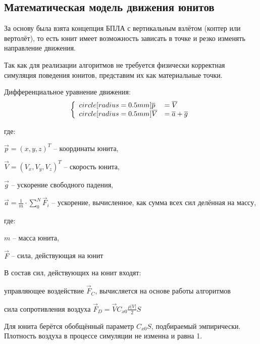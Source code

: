 \subsection{Математическая модель движения юнитов}

За основу была взята концепция БПЛА с вертикальным взлётом (коптер или вертолёт),
то есть юнит имеет возможность зависать в точке и резко изменять направление движения.

Так как для реализации алгоритмов не требуется физически корректная симуляция
поведения юнитов, представим их как материальные точки.

Дифференциальное уравнение движения:
$$
\left\{
    \begin{array}{l l}
    \dot{\vec{p}}  & = \vec V \\
    \dot{\vec{V}}  & = \vec a + \vec g
    \end{array}
\right.
$$

где:

$\vec p = (x,y,z)^T$ -- координаты юнита,

$\vec V = (V_x,V_y,V_z)^T$ -- скорость юнита,

$\vec g$ -- ускорение свободного падения,

$\vec a = \frac{1}{m} \cdot \sum_0^N \vec F_i$ -- ускорение,
вычисленное, как сумма всех сил делённая на массу,

где:

$m$ -- масса юнита,

$\vec F$ -- сила, действующая на юнит

В состав сил, действующих на юнит входят:

\begin{mintemize}
\item управляющее воздействие $\vec F_C$, вычисляется на основе работы алгоритмов
\item сила сопротивления воздуха $\vec F_D = \vec V C_{x0} \frac{\rho |V|}{2} S$
\end{mintemize}

Для юнита берётся обобщённый параметр $C_{x0}S$, подбираемый эмпирически.
Плотность воздуха в процессе симуляции не изменна и равна 1.
